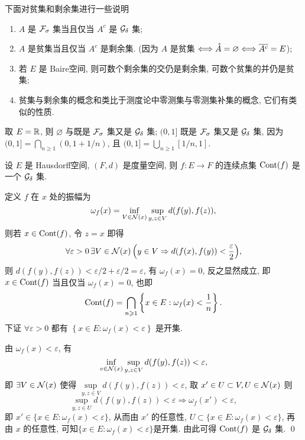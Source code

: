 	\begin{Remark}
		下面对贫集和剩余集进行一些说明
		\begin{enumerate}[(1)]
			\item $ A $ 是 $ \CF_{\sigma} $ 集当且仅当 $ A^{c} $ 是 $ \CG_{\delta} $ 集;
			\item $ A $ 是贫集当且仅当 $ A^{c} $ 是剩余集. (因为 $ A $ 是贫集 $ \Longleftrightarrow\mathring{A}=\varnothing\Longleftrightarrow\baro{A^{c}}=E $);
			\item 若 $ E $ 是 Baire空间, 则可数个剩余集的交仍是剩余集, 可数个贫集的并仍是贫集;
			\item 贫集与剩余集的概念和类比于测度论中零测集与零测集补集的概念, 它们有类似的性质.
		\end{enumerate}
	\end{Remark}

	\begin{Example}
		取 $ E=\R $, 则 $ \varnothing $ 与\R 既是 $ \CF_{\sigma} $ 集又是 $ \CG_{\delta} $ 集; $ (0, 1] $ 既是 $ \CF_{\sigma} $ 集又是 $ \CG_{\delta} $ 集, 因为 $ (0, 1]=\bigcap_{n\geqslant1}(0, 1+1/n) $, 且 $ (0, 1]=\bigcup_{n\geqslant1}[1/n, 1] $. 
	\end{Example}

	\begin{Lemma}
		设 $ E $ 是 Hausdorff空间,  $ (F, d) $ 是度量空间, 则 $ f : E\to F $ 的连续点集 $ \cont(f) $ 是一个 $ \CG_{\delta} $ 集.
		\end{Lemma}
	\begin{Proof}
		定义 $ f $ 在 $ x $ 处的振幅为
		\[
			\omega_{f}(x)=\inf_{V\in\CN(x)}\sup_{y, z\in V}d(f(y), f(z)),
		\]
		则若 $ x\in \cont(f) $, 令 $ z=x $ 即得
		\[
			\forall\varepsilon >0\,\exists V\in\CN(x)\,\Big(y\in V\Rightarrow d(f(x), f(y))<\frac{\varepsilon}{2}\Big),
		\]
		则 $ d(f(y), f(z))<\varepsilon/2+\varepsilon/2=\varepsilon $, 有 $ \omega_{f}(x)=0 $, 反之显然成立, 即 $ x\in\cont(f) $ 当且仅当 $ \omega_{f}(x)=0 $, 也即
		\[
			\cont(f)=\bigcap_{n\geqslant1}\left\{ x\in E : \omega_{f}(x)<\frac{1}{n} \right\}.
		\]
		下证 $ \forall \varepsilon>0 $ 都有 $ \left\{ x\in E: \omega_{f}(x)<\varepsilon \right\} $ 是开集.

		由 $ \omega_{f}(x)<\varepsilon $, 有
		\[
			\inf_{v\in\CN(x)}\sup_{y, z\in V}d(f(y), f(z))<\varepsilon,
		\]
		即 $ \exists V\in\CN(x) $ 使得 $ \sup\limits_{y, z\in V}d(f(y), f(z))<\varepsilon $, 取 $ x'\in U\subset V, U\in \CN(x) $ 则
		\[
			\sup_{y, z\in U}d(f(y), f(z))<\varepsilon \Longrightarrow \omega_{f}(x')<\varepsilon,
		\]
		即 $ x'\in\{ x\in E : \omega_{f}(x)<\varepsilon \} $, 从而由 $ x' $ 的任意性, $ U\subset\{ x\in E : \omega_{f}(x)<\varepsilon \}  $, 再由 $ x $ 的任意性, 可知$\{ x\in E : \omega_{f}(x)<\varepsilon \}$是开集. 由此可得 $ \cont(f) $ 是 $ \CG_{\delta} $ 集. \qed
	\end{Proof}
		
